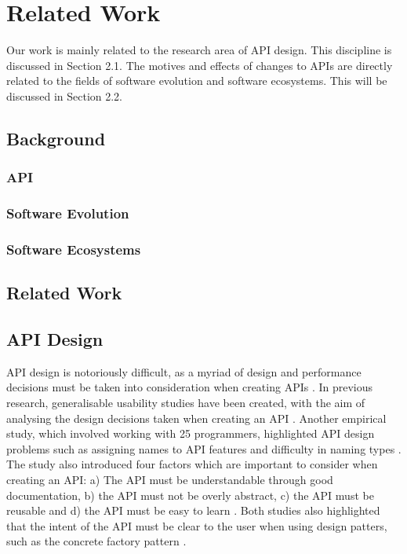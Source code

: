 \documentclass[10pt,twocolumn]{article}
\begin{document}
\section{Related Work}
Our work is mainly related to the research area of API design. This discipline is discussed in Section 2.1. The motives and effects of changes to APIs are directly related to the fields of software evolution and software ecosystems. This will be discussed in Section 2.2. 

\subsection{Background}

\subsubsection{API}


\subsubsection{Software Evolution}



\subsubsection{Software Ecosystems}



\subsection{Related Work}


\subsection{API Design}
API design is notoriously difficult, as a myriad of design and performance decisions must be taken into consideration when creating APIs \cite{bloch2008effective} \cite{afonso2012evaluating} \cite{stylos2006comparing}. In previous research, generalisable usability studies have been created, with the aim of analysing the design decisions taken when creating an API \cite{stylos2006comparing}. Another empirical study, which involved working with 25 programmers, highlighted API design problems such as assigning names to API features and difficulty in naming types \cite{shi2011empirical}. The study also introduced four factors which are important to consider when creating an API: a) The API  must be understandable through good documentation, b) the API must not be overly abstract, c) the API must be reusable and d) the API must be easy to learn \cite{shi2011empirical}. Both studies also highlighted that the intent of the API must be clear to the user when using design patters, such as the concrete factory pattern \cite{shi2011empirical} \cite{stylos2006comparing}.
\end{document}
